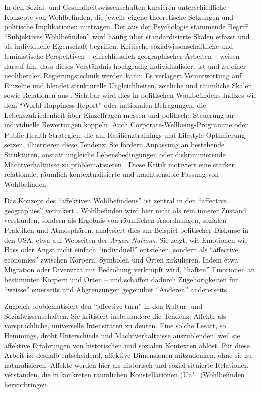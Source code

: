 In den Sozial- und Gesundheitswissenschaften kursieren unterschiedliche Konzepte von Wohlbefinden, die jeweils eigene theoretische Setzungen und politische Implikationen mittragen. Der aus der Psychologie stammende Begriff \enquote{Subjektives Wohlbefinden} wird häufig über standardisierte Skalen erfasst und als individuelle Eigenschaft begriffen. Kritische sozialwissenschaftliche und feministische Perspektiven -- einschliesslich geographischer Arbeiten -- weisen darauf hin, dass dieses Verständnis hochgradig individualisiert ist und zu einer neoliberalen Regierungstechnik werden kann: Es verlagert Verantwortung auf Einzelne und blendet strukturelle Ungleichheiten, zeitliche und räumliche Skalen sowie Relationen aus \parencite{atkinsonToxicEffectsSubjective2021}. Sichtbar wird dies in politischen Wohlbefindens-Indizes wie dem \enquote{World Happiness Report} oder nationalen Befragungen, die Lebenszufriedenheit über Einzelfragen messen und politische Steuerung an individuelle Bewertungen koppeln. Auch Corporate-Wellbeing-Programme oder Public-Health-Strategien, die auf Resilienztrainings und Lifestyle-Optimierung setzen, illustrieren diese Tendenz: Sie fördern Anpassung an bestehende Strukturen, anstatt ungleiche Lebensbedingungen oder diskriminierende Machtverhältnisse zu problematisieren \parencite[\gls{vgl}]{atkinsonToxicEffectsSubjective2021}. Diese Kritik motiviert eine stärker relationale, räumlich-kontextualisierte und machtsensible Fassung von Wohlbefinden.

Das Konzept des \enquote{affektiven Wohlbefindens} ist zentral in den \enquote{affective geographies} verankert \parencite{hoSocialGeographyIII2024}. Wohlbefinden wird hier nicht als rein innerer Zustand verstanden, sondern als Ergebnis von räumlichen Anordnungen, sozialen Praktiken und Atmosphären. \textcite{ahmedAffectiveEconomies2004} analysiert dies am Beispiel politischer Diskurse in den USA, etwa auf Webseiten der \emph{Aryan Nations}. Sie zeigt, wie Emotionen wie Hass oder Angst nicht einfach \enquote{individuell} entstehen, sondern als \enquote{affective economies} zwischen Körpern, Symbolen und Orten zirkulieren. Indem etwa Migration oder Diversität mit Bedrohung verknüpft wird, \enquote{haften} Emotionen an bestimmten Körpern und Orten -- und schaffen dadurch Zugehörigkeiten für \enquote{weisse} einerseits und Abgrenzungen gegenüber \enquote{Anderen} andererseits.

Zugleich problematisiert \textcite{hemmingsInvokingAffectCultural2005} den \enquote{affective turn} in den Kultur- und Sozialwissenschaften. Sie kritisiert insbesondere die Tendenz, Affekte als vorsprachliche, universelle Intensitäten zu deuten. Eine solche Lesart, so Hemmings, droht Unterschiede und Machtverhältnisse auszublenden, weil sie affektive Erfahrungen von historischen und sozialen Kontexten ablöst. Für diese Arbeit ist deshalb entscheidend, affektive Dimensionen mitzudenken, ohne sie zu naturalisieren: Affekte werden hier als historisch und sozial situierte Relationen verstanden, die in konkreten räumlichen Konstellationen (Un\nobreakdash"=)Wohlbefinden hervorbringen.

